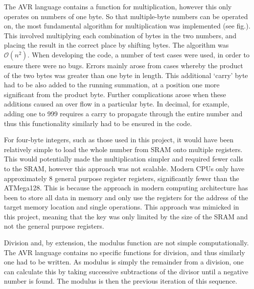 \documentclass[a4paper,11pt,twocolumn]{article}
\begin{document}
	The AVR language contains a function for multiplication, however this only operates on numbers of one byte. So that multiple-byte numbers can be operated on, the most fundamental algorithm for multiplication was implemented (see fig.). This involved multiplying each combination of bytes in the two numbers, and placing the result in the correct place by shifting bytes. The algorithm was $\mathcal{O}\left(n^2\right)$. When developing the code, a number of test cases were used, in order to ensure there were no bugs. Errors mainly arose from cases whereby the product of the two bytes was greater than one byte in length. This additional `carry' byte had to be also added to the running summation, at a position one more significant from the product byte. Further complications arose when these additions caused an over flow in a particular byte. In decimal, for example, adding one to 999 requires a carry to propagate through the entire number and thus this functionality similarly had to be ensured in the code.
	
	For four-byte integers, such as those used in this project, it would have been relatively simple to load the whole number from SRAM onto multiple registers. This would potentially made the multiplication simpler and required fewer calls to the SRAM, however this approach was not scalable. Modern CPUs only have approximately 8 general purpose register registers, significantly fewer than the ATMega128. This is because the approach in modern computing architecture has been to store all data in memory and only use the registers for the address of the target memory location and single operations. This approach was mimicked in this project, meaning that the key was only limited by the size of the SRAM and not the general purpose registers.
	
	Division and, by extension, the modulus function are not simple computationally. The AVR language contains no specific functions for division, and thus similarly one had to be written. As modulus is simply the remainder from a division, one can calculate this by taking successive subtractions of the divisor until a negative number is found. The modulus is then the previous iteration of this sequence. 
	
\end{document}
